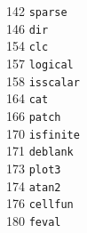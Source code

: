 \begin{footnotesize}
\begin{multicols}{3}
\vspace{-.153cm} 142   \hspace{.2cm} {\tt sparse              }     \\ %
\vspace{-.153cm} 146   \hspace{.2cm} {\tt dir                 }     \\ %
\vspace{-.153cm} 154   \hspace{.2cm} {\tt clc                 }     \\ %
\vspace{-.153cm} 157   \hspace{.2cm} {\tt logical             }     \\ %
\vspace{-.153cm} 158   \hspace{.2cm} {\tt isscalar            }     \\ %
\vspace{-.153cm} 164   \hspace{.2cm} {\tt cat                 }     \\ %
\vspace{-.153cm} 166   \hspace{.2cm} {\tt patch               }     \\ %
\vspace{-.153cm} 170   \hspace{.2cm} {\tt isfinite            }     \\ %
\vspace{-.153cm} 171   \hspace{.2cm} {\tt deblank             }     \\ %
\vspace{-.153cm} 173   \hspace{.2cm} {\tt plot3               }     \\ %
\vspace{-.153cm} 174   \hspace{.2cm} {\tt atan2               }     \\ %
\vspace{-.153cm} 176   \hspace{.2cm} {\tt cellfun             }     \\ %
\vspace{-.153cm} 180   \hspace{.2cm} {\tt feval               }     \\ %

\end{multicols}
\end{footnotesize}
